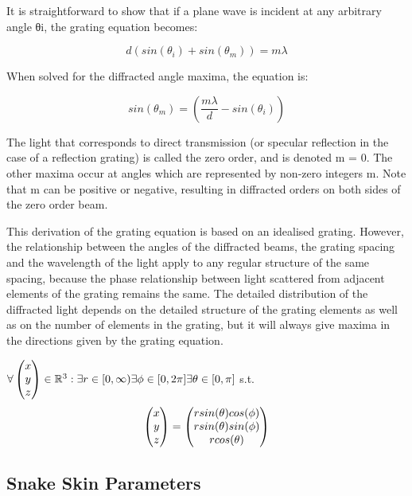 It is straightforward to show that if a plane wave is incident at any arbitrary angle θi, the grating equation becomes:

\begin{equation*}
d(sin(\theta_i) + sin(\theta_m)) = m \lambda
\end{equation*}

When solved for the diffracted angle maxima, the equation is:

\begin{equation*}
sin(\theta_m) = \left(\frac{m\lambda}{d}-sin(\theta_i)\right)
\end{equation*}

The light that corresponds to direct transmission (or specular reflection in the case of a reflection grating) is called the zero order, and is denoted m = 0. The other maxima occur at angles which are represented by non-zero integers m. Note that m can be positive or negative, resulting in diffracted orders on both sides of the zero order beam.

This derivation of the grating equation is based on an idealised grating. However, the relationship between the angles of the diffracted beams, the grating spacing and the wavelength of the light apply to any regular structure of the same spacing, because the phase relationship between light scattered from adjacent elements of the grating remains the same. The detailed distribution of the diffracted light depends on the detailed structure of the grating elements as well as on the number of elements in the grating, but it will always give maxima in the directions given by the grating equation.


$\forall \colvec[x]{y}{z} \in \mathbb{R}^3 : \exists r \in [0,\infty) \exists \phi \in [0,2\pi] \exists \theta \in [0,\pi] $ s.t.
\begin{equation*}
\colvec[x]{y}{z} = \colvec[r sin(\theta)cos(\phi)]{r sin(\theta)sin(\phi)}{r cos(\theta)}
\end{equation*}

\subsection{Snake Skin Parameters}